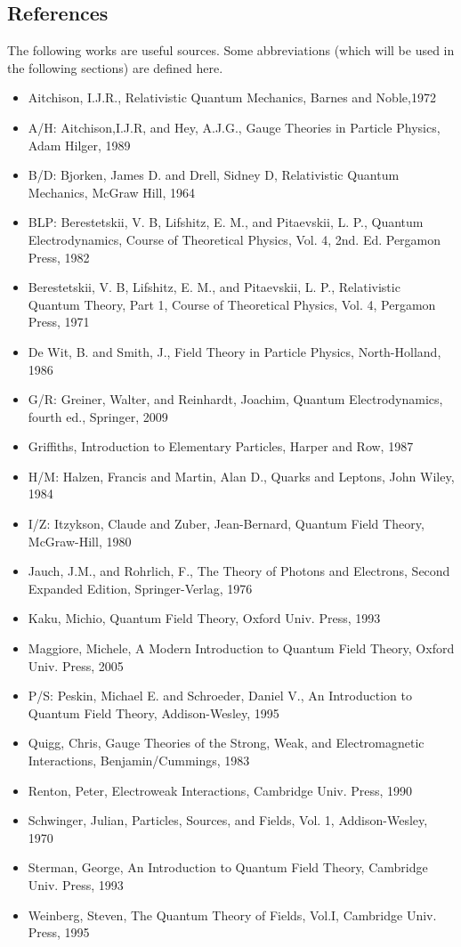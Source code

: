 \documentclass[11pt]{article}
\begin{document}
\subsection{References}
The following works are useful sources.
Some abbreviations (which will be used in the following sections) are defined here.
\begin{itemize}
\item Aitchison, I.J.R., Relativistic Quantum Mechanics, Barnes and Noble,1972
\item A/H: Aitchison,I.J.R, and Hey, A.J.G., Gauge Theories in Particle
  Physics, Adam Hilger, 1989
\item B/D: Bjorken, James D. and Drell, Sidney D, Relativistic Quantum
  Mechanics, McGraw Hill, 1964
\item BLP: Berestetskii, V. B, Lifshitz, E. M., and Pitaevskii, L. P.,
  Quantum Electrodynamics, Course of Theoretical Physics, Vol. 4, 2nd. Ed.
  Pergamon Press, 1982
\item  Berestetskii, V. B, Lifshitz, E. M., and Pitaevskii, L. P.,
  Relativistic Quantum Theory, Part 1, Course of Theoretical Physics, Vol. 4, 
  Pergamon Press, 1971
\item De Wit, B. and Smith, J., Field Theory in Particle Physics, 
          North-Holland, 1986
\item G/R:  Greiner, Walter, and Reinhardt, Joachim, Quantum Electrodynamics,
   fourth ed., Springer, 2009
\item  Griffiths, Introduction to Elementary Particles, Harper and Row,
       1987
\item H/M: Halzen, Francis and Martin, Alan D., Quarks and Leptons,
         John Wiley, 1984
\item I/Z: Itzykson, Claude and Zuber, Jean-Bernard, Quantum Field Theory, 
        McGraw-Hill, 1980
\item Jauch, J.M., and Rohrlich, F., The Theory of Photons and Electrons,
    Second Expanded Edition, Springer-Verlag, 1976
\item Kaku, Michio, Quantum Field Theory, Oxford Univ. Press, 1993
\item Maggiore, Michele, A Modern Introduction to Quantum Field Theory,
    Oxford Univ. Press, 2005
\item P/S: Peskin, Michael E. and Schroeder, Daniel V., An Introduction
  to Quantum Field Theory, Addison-Wesley, 1995
\item Quigg, Chris, Gauge Theories of the Strong, Weak, and Electromagnetic
  Interactions, Benjamin/Cummings, 1983
\item Renton, Peter, Electroweak Interactions, Cambridge Univ. Press, 1990
\item Schwinger, Julian, Particles, Sources, and Fields, Vol. 1,
          Addison-Wesley, 1970
\item Sterman, George, An Introduction to Quantum Field Theory,
        Cambridge Univ. Press, 1993
\item Weinberg, Steven, The Quantum Theory of Fields, Vol.I,
          Cambridge Univ. Press, 1995
\end{itemize}
\end{document}
